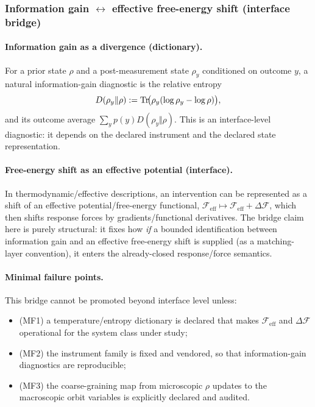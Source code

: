 \subsubsection{Information gain $\leftrightarrow$ effective free-energy shift (interface bridge)}
\paragraph{Information gain as a divergence (dictionary).}
\InterfaceTag For a prior state $\rho$ and a post-measurement state $\rho_y$ conditioned on outcome $y$, a natural information-gain diagnostic is the relative entropy
\[
D(\rho_y\Vert \rho):=\mathrm{Tr}\!\bigl(\rho_y(\log\rho_y-\log\rho)\bigr),
\]
and its outcome average $\sum_y p(y)D(\rho_y\Vert\rho)$.
This is an interface-level diagnostic: it depends on the declared instrument and the declared state representation.

\paragraph{Free-energy shift as an effective potential (interface).}
\InterfaceTag In thermodynamic/effective descriptions, an intervention can be represented as a shift of an effective potential/free-energy functional, $\mathcal{F}_{\mathrm{eff}}\mapsto \mathcal{F}_{\mathrm{eff}}+\Delta\mathcal{F}$, which then shifts response forces by gradients/functional derivatives.
The bridge claim here is purely structural: it fixes how \emph{if} a bounded identification between information gain and an effective free-energy shift is supplied (as a matching-layer convention), it enters the already-closed response/force semantics.

\paragraph{Minimal failure points.}
\AuditTag This bridge cannot be promoted beyond interface level unless:
\begin{itemize}
\item (MF1) a temperature/entropy dictionary is declared that makes $\mathcal{F}_{\mathrm{eff}}$ and $\Delta\mathcal{F}$ operational for the system class under study;
\item (MF2) the instrument family is fixed and vendored, so that information-gain diagnostics are reproducible;
\item (MF3) the coarse-graining map from microscopic $\rho$ updates to the macroscopic orbit variables is explicitly declared and audited.
\end{itemize}
